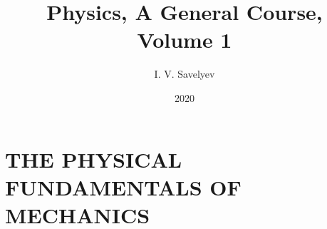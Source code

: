 \documentclass[11pt, twoside, fleqn]{book}
\title{Physics, A General Course, Volume 1}
\author{I. V. Savelyev}
\date{2020}
\numberwithin{equation}{chapter}
\begin{document}
\setlength{\abovedisplayskip}{3pt}
\setlength{\belowdisplayskip}{3pt}
\setlength{\abovedisplayshortskip}{3pt}
\setlength{\belowdisplayshortskip}{3pt}

\frontmatter


\cleardoublepage

\cleardoublepage

\cleardoublepage
{\hypersetup{linkcolor=black!80}
	\tableofcontents
}
\cleardoublepage

\mainmatter


\cleardoublepage

\part{THE PHYSICAL FUNDAMENTALS OF MECHANICS}\label{part:part_a}
\cleardoublepage

\cleardoublepage

\cleardoublepage

\cleardoublepage

\cleardoublepage

\cleardoublepage

\cleardoublepage


\cleardoublepage

\end{document}
